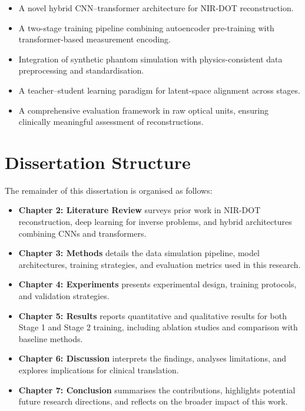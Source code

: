 \begin{itemize}
    \item A novel hybrid CNN–transformer architecture for NIR-DOT reconstruction.
    \item A two-stage training pipeline combining autoencoder pre-training with transformer-based measurement encoding.
    \item Integration of synthetic phantom simulation with physics-consistent data preprocessing and standardisation.
    \item A teacher–student learning paradigm for latent-space alignment across stages.
    \item A comprehensive evaluation framework in raw optical units, ensuring clinically meaningful assessment of reconstructions.
\end{itemize}

\section{Dissertation Structure}

The remainder of this dissertation is organised as follows:

\begin{itemize}
    \item \textbf{Chapter 2: Literature Review} surveys prior work in NIR-DOT reconstruction, deep learning for inverse problems, and hybrid architectures combining CNNs and transformers.
    \item \textbf{Chapter 3: Methods} details the data simulation pipeline, model architectures, training strategies, and evaluation metrics used in this research.
    \item \textbf{Chapter 4: Experiments} presents experimental design, training protocols, and validation strategies.
    \item \textbf{Chapter 5: Results} reports quantitative and qualitative results for both Stage 1 and Stage 2 training, including ablation studies and comparison with baseline methods.
    \item \textbf{Chapter 6: Discussion} interprets the findings, analyses limitations, and explores implications for clinical translation.
    \item \textbf{Chapter 7: Conclusion} summarises the contributions, highlights potential future research directions, and reflects on the broader impact of this work.
\end{itemize}
